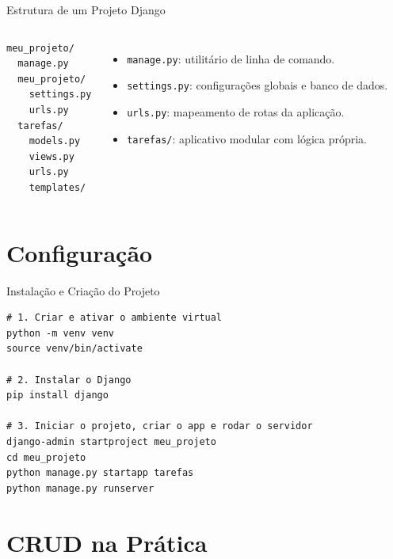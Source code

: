 \documentclass[aspectratio=169, 11pt]{beamer}
\begin{document}
\begin{frame}[fragile]{Estrutura de um Projeto Django}
  \begin{columns}[c]
\begin{lstlisting}
meu_projeto/
  manage.py
  meu_projeto/
    settings.py
    urls.py
  tarefas/
    models.py
    views.py
    urls.py
    templates/
\end{lstlisting}

    \begin{itemize}
      \setlength\itemsep{0.5em}
      \item \texttt{manage.py}: utilitário de linha de comando.
      \item \texttt{settings.py}: configurações globais e banco de dados.
      \item \texttt{urls.py}: mapeamento de rotas da aplicação.
      \item \texttt{tarefas/}: aplicativo modular com lógica própria.
    \end{itemize}
  \end{columns}
\end{frame}

\section{Configuração}

\begin{frame}[fragile]{Instalação e Criação do Projeto}
\begin{lstlisting}
# 1. Criar e ativar o ambiente virtual
python -m venv venv
source venv/bin/activate

# 2. Instalar o Django
pip install django

# 3. Iniciar o projeto, criar o app e rodar o servidor
django-admin startproject meu_projeto
cd meu_projeto
python manage.py startapp tarefas
python manage.py runserver
\end{lstlisting}
\end{frame}

\section{CRUD na Prática}
\end{document}
